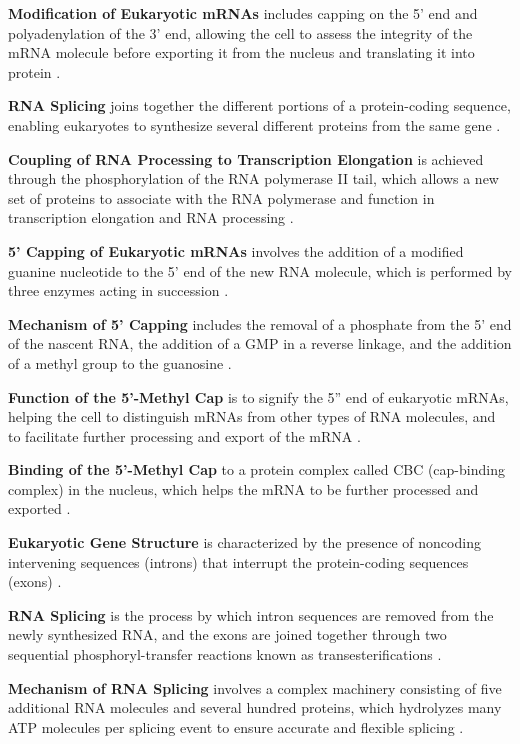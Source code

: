 \textbf{Modification of Eukaryotic mRNAs} includes capping on the 5' end and polyadenylation of the 3' end, allowing the cell to assess the integrity of the mRNA molecule before exporting it from the nucleus and translating it into protein \cite*{L1-Chapter6}.

\textbf{RNA Splicing} joins together the different portions of a protein-coding sequence, enabling eukaryotes to synthesize several different proteins from the same gene \cite*{L1-Chapter6}. 

\textbf{Coupling of RNA Processing to Transcription Elongation} is achieved through the phosphorylation of the RNA polymerase II tail, which allows a new set of proteins to associate with the RNA polymerase and function in transcription elongation and RNA processing \cite*{L1-Chapter6}.

\textbf{5' Capping of Eukaryotic mRNAs} involves the addition of a modified guanine nucleotide to the 5' end of the new RNA molecule, which is performed by three enzymes acting in succession \cite*{L1-Chapter6}.

\textbf{Mechanism of 5' Capping} includes the removal of a phosphate from the 5' end of the nascent RNA, the addition of a GMP in a reverse linkage, and the addition of a methyl group to the guanosine \cite*{L1-Chapter6}.

\textbf{Function of the 5'-Methyl Cap} is to signify the 5'' end of eukaryotic mRNAs, helping the cell to distinguish mRNAs from other types of RNA molecules, and to facilitate further processing and export of the mRNA \cite*{L1-Chapter6}.

\textbf{Binding of the 5'-Methyl Cap} to a protein complex called CBC (cap-binding complex) in the nucleus, which helps the mRNA to be further processed and exported \cite*{L1-Chapter6}.

\textbf{Eukaryotic Gene Structure} is characterized by the presence of noncoding intervening sequences (introns) that interrupt the protein-coding sequences (exons) \cite*{L1-Chapter6}.

\textbf{RNA Splicing} is the process by which intron sequences are removed from the newly synthesized RNA, and the exons are joined together through two sequential phosphoryl-transfer reactions known as transesterifications \cite*{L1-Chapter6}.

\textbf{Mechanism of RNA Splicing} involves a complex machinery consisting of five additional RNA molecules and several hundred proteins, which hydrolyzes many ATP molecules per splicing event to ensure accurate and flexible splicing \cite*{L1-Chapter6}.

